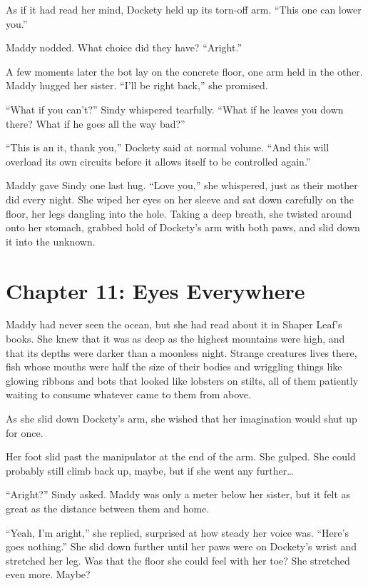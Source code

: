 \documentclass[10pt]{article}
\begin{document}
As if it had read her mind, Dockety held up its torn-off arm. ``This one
can lower you.''

Maddy nodded. What choice did they have? ``Aright.''

A few moments later the bot lay on the concrete floor, one arm held in
the other. Maddy hugged her sister. ``I'll be right back,'' she
promised.

``What if you can't?'' Sindy whispered tearfully. ``What if he leaves
you down there? What if he goes all the way bad?''

``This is an it, thank you,'' Dockety said at normal volume. ``And this
will overload its own circuits before it allows itself to be controlled
again.''

Maddy gave Sindy one last hug. ``Love you,'' she whispered, just as
their mother did every night. She wiped her eyes on her sleeve and sat
down carefully on the floor, her legs dangling into the hole. Taking a
deep breath, she twisted around onto her stomach, grabbed hold of
Dockety's arm with both paws, and slid down it into the unknown.

\newpage
\section{Chapter 11: Eyes Everywhere}

Maddy had never seen the ocean, but she had read about it in Shaper
Leaf's books. She knew that it was as deep as the highest mountains were
high, and that its depths were darker than a moonless night. Strange
creatures lives there, fish whose mouths were half the size of their
bodies and wriggling things like glowing ribbons and bots that looked
like lobsters on stilts, all of them patiently waiting to consume
whatever came to them from above.

As she slid down Dockety's arm, she wished that her imagination would
shut up for once.

Her foot slid past the manipulator at the end of the arm. She gulped.
She could probably still climb back up, maybe, but if she went any
further\ldots{}

``Aright?'' Sindy asked. Maddy was only a meter below her sister, but it
felt as great as the distance between them and home.

``Yeah, I'm aright,'' she replied, surprised at how steady her voice
was. ``Here's goes nothing.'' She slid down further until her paws were
on Dockety's wrist and stretched her leg. Was that the floor she could
feel with her toe? She stretched even more. Maybe?
\end{document}
